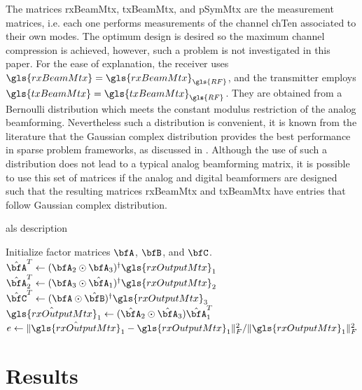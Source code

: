 \documentclass[conference]{IEEEtran}
\begin{document}
The matrices \gls{rxBeamMtx},
\gls{txBeamMtx}, and \gls{pSymMtx} are the measurement matrices, i.e. each one
performs measurements of the channel \gls{chTen} associated to their own modes.
The optimum design is desired so the maximum channel compression is achieved,
however, such a problem  is not investigated in this paper. For the ease of
explanation, the receiver uses $\gls{rxBeamMtx} =
\gls{rxBeamMtx}_{\gls{RF}}$,  and the transmitter employs $\gls{txBeamMtx} =
\gls{txBeamMtx}_{\gls{RF}}$. They are obtained from a Bernoulli distribution which meets the constant
modulus restriction of the analog beamforming. Nevertheless such a distribution
is convenient, it is known from the
literature that the Gaussian complex distribution provides the best
performance in sparse problem frameworks, as discussed in  \cite{Donoho:2006}.
Although the use of such a distribution does not lead to a typical analog beamforming
matrix, it is possible to use this set of matrices if the analog
and digital beamformers are designed such that the resulting matrices
\gls{rxBeamMtx} and \gls{txBeamMtx} have entries that follow 
Gaussian complex distribution. 


\label{sec:algorithm}
\begin{algorithm}   
    \caption{\gls{als} description } \label{alg.:als}
    \begin{algorithmic}
      \STATE Initialize factor matrices $\bfA$, $\bfB$, and $\bfC$.
      \STATE $\hat{\bfA}^T \gets (\bfA_2 \odot \bfA_3)^{\dagger}\gls{rxOutputMtx}_1 $
      \STATE $\hat{\bfA}_2^T \gets (\bfA_3 \odot \hat{\bfA}_1)^{\dagger}\gls{rxOutputMtx}_2 $
      \STATE $\hat{\bfC}^T \gets ({\bfA} \odot \hat{\bfB})^{\dagger}\gls{rxOutputMtx}_3 $
      \STATE $\hat{\gls{rxOutputMtx}}_1 \gets (\hat{\bfA}_2 \odot \hat{\bfA}_3)\hat{\bfA}_1^T$
      \STATE $ e \gets \|\hat{\gls{rxOutputMtx}}_1 - \gls{rxOutputMtx}_1 \|^2_F/ \|\gls{rxOutputMtx}_1\|_F^2$
      \ENDWHILE

      
    \end{algorithmic}
\end{algorithm}

\section{Results}
\end{document}
